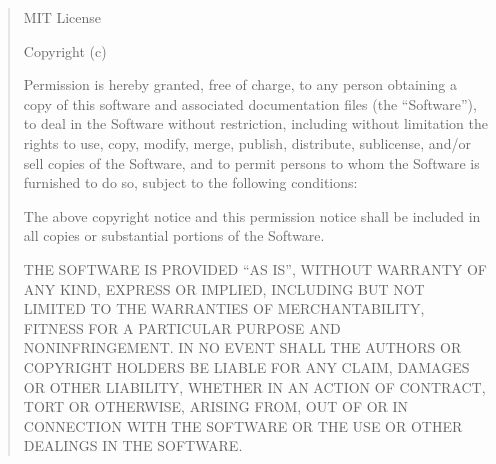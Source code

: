 %

\makeatletter

\expandafter\def\csname qthesis@licensetext@MIT\endcsname{%
  \begin{quote}\small\raggedright
    MIT License

    Copyright (c) \ifstrempty{\qthesis@licenseyear}{\number\year}{\qthesis@licenseyear}\ %
    \ifstrempty{\qthesis@copyrightholder}{\qthesis@author}{\qthesis@copyrightholder}

    Permission is hereby granted, free of charge, to any person obtaining a copy of this software and associated documentation files (the ``Software''), to deal in the Software without restriction, including without limitation the rights to use, copy, modify, merge, publish, distribute, sublicense, and/or sell copies of the Software, and to permit persons to whom the Software is furnished to do so, subject to the following conditions:

    The above copyright notice and this permission notice shall be included in all copies or substantial portions of the Software.

    THE SOFTWARE IS PROVIDED ``AS IS'', WITHOUT WARRANTY OF ANY KIND, EXPRESS OR IMPLIED, INCLUDING BUT NOT LIMITED TO THE WARRANTIES OF MERCHANTABILITY, FITNESS FOR A PARTICULAR PURPOSE AND NONINFRINGEMENT. IN NO EVENT SHALL THE AUTHORS OR COPYRIGHT HOLDERS BE LIABLE FOR ANY CLAIM, DAMAGES OR OTHER LIABILITY, WHETHER IN AN ACTION OF CONTRACT, TORT OR OTHERWISE, ARISING FROM, OUT OF OR IN CONNECTION WITH THE SOFTWARE OR THE USE OR OTHER DEALINGS IN THE SOFTWARE.
  \end{quote}%
}

